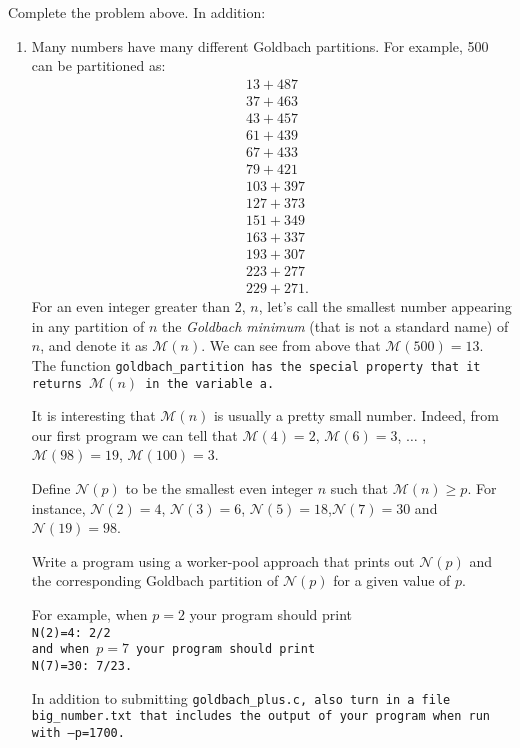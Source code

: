 \documentclass{article}
\newcommand{\M}{\mathcal{M}}
\newcommand{\N}{\mathcal{N}}
\begin{document}
\newpage


Complete the problem above.  In addition:

\begin{enumerate}
\item Many numbers have many different Goldbach partitions.  For
  example, 500 can be partitioned as:
\begin{align*}
&	13+487\\
&	37+463\\
&	43+457\\
&	61+439\\
&	67+433\\
&	79+421\\
&	103+397\\
&	127+373\\
&	151+349\\
&	163+337\\
&	193+307\\
&	223+277\\
&	229+271.
\end{align*}
For an even integer greater than 2, $n$, let's call the smallest
number appearing in any partition of $n$ the \textit{Goldbach minimum}
(that is not a standard name)
of $n$, and denote it as $\M(n)$. We can see from above that
$\M(500)=13$. The function \tt{goldbach\_partition} has the special
property that it returns $\M(n)$ in the variable \tt{a}. 

It is interesting that $\M(n)$ is usually a pretty small number. 
Indeed, from our first program we can tell that $\M(4)=2$, $\M(6)=3$,
$\dots$ , $\M(98)=19$, $\M(100)=3$.

Define $\N(p)$ to be the smallest even integer $n$ such that $\M(n)\ge
p$. For instance, $\N(2)=4$, $\N(3)=6$, $\N(5)=18$,$\N(7)=30$ and $\N(19)=98$.

Write a program using a worker-pool approach that prints out $\N(p)$
and the corresponding Goldbach partition of $\N(p)$ for a given value
of $p$. 

For example, when $p=2$ your program should print\\
\tt{N(2)=4: 2/2}\\
and when $p=7$ your program should print\\
\tt{N(7)=30: 7/23}.

In addition to submitting \tt{goldbach\_plus.c}, also turn in a file
\tt{big\_number.txt} that includes the output of your program when run
with \tt{--p=1700}. 


\end{enumerate}
\end{document}
